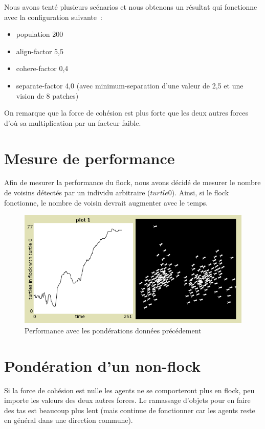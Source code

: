 \documentclass{article}
\begin{document}
Nous avons tenté plusieurs scénarios et nous obtenons un résultat qui fonctionne avec la configuration suivante~:
\begin{itemize}
  \item population 200
  \item align-factor 5,5
  \item cohere-factor 0,4
  \item separate-factor 4,0 (avec minimum-separation d'une valeur de 2,5 et une vision de 8 patches)
\end{itemize}
On remarque que la force de cohésion est plus forte que les deux autres forces d'où sa multiplication par un facteur faible.

\section{Mesure de performance}

Afin de mesurer la performance du flock, nous avons décidé de mesurer le nombre de voisins détectés par un individu arbitraire ($turtle 0$). Ainsi, si le flock fonctionne, le nombre de voisin devrait augmenter avec le temps.

\begin{figure}[h]
	\begin{center}
		\includegraphics[scale=0.5]{img/performance}
		\caption{Performance avec les pondérations données précédement}
		\label{fig:performance}
	\end{center}
\end{figure}

\section{Pondération d'un non-flock}
Si la force de cohésion est nulle les agents ne se comporteront plus en flock, peu importe les valeurs des deux autres forces. Le ramassage d'objets pour en faire des tas est beaucoup plus lent (mais continue de fonctionner car les agents reste en général dans une direction commune).
\end{document}
